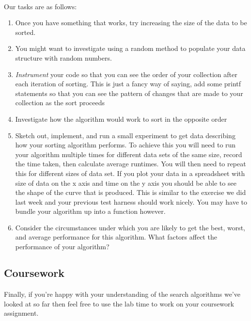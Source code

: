 \documentclass[10pt, a4paper, twosize]{article}
\begin{document}
\paragraph{} Our tasks are as follows:
\begin{enumerate}
\item Once you have something that works, try increasing the size of the data to be sorted.
\item You might want to investigate using a random method to populate your data structure with random numbers.
\item \emph{Instrument} your code so that you can see the order of your collection after each iteration of sorting. This is just a fancy way of saying, add some printf statements so that you can see the pattern of changes that are made to your collection as the sort proceeds
\item Investigate how the algorithm would work to sort in the opposite order
\item Sketch out, implement, and run a small experiment to get data describing how your sorting algorithm performs. To achieve this you will need to run your algorithm multiple times for different data sets of the same size, record the time taken, then calculate average runtimes. You will then need to repeat this for different sizes of data set. If you plot your data in a spreadsheet with size of data on the x axis and time on the y axis you should be able to see the shape of the curve that is produced. This is similar to the exercise we did last week and your previous test harness should work nicely. You may have to bundle your algorithm up into a function however.
\item Consider the circumstances under which you are likely to get the best, worst, and average performance for this algorithm. What factors affect the performance of your algorithm?
\end{enumerate}



\subsection{Coursework}

\paragraph{} Finally, if you're happy with your understanding of the search algorithms we've looked at so far then feel free to use the lab time to work on your coursework assignment.






\end{document}

